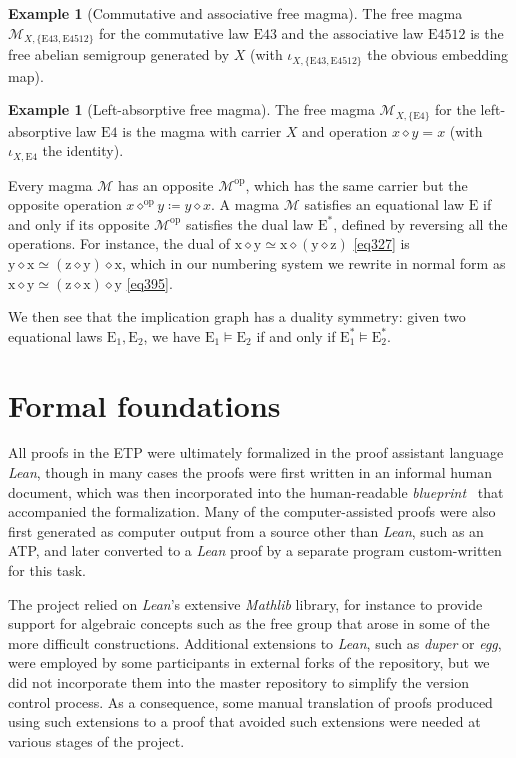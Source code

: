 \documentclass[12pt]{amsart}
\theoremstyle{definition}
\newtheorem{example}[theorem]{Example}
\newcommand{\x}{\mathrm{x}}
\newcommand{\y}{\mathrm{y}}
\newcommand{\z}{\mathrm{z}}
\newcommand{\op}{\diamond}
\newcommand{\formaleq}{\simeq}
\newcommand{\Magma}{{\mathcal{M}}}
\newcommand{\Eq}[1]{\mathrm{E}#1}
\newcommand{\E}{\mathrm{E}}
\begin{document}
\begin{example}[Commutative and associative free magma]\label{semi-group} The free magma $\Magma_{X,\{\Eq{43}, \Eq{4512}\}}$ for the commutative law $\Eq{43}$ and the associative law $\Eq{4512}$ is the free abelian semigroup generated by $X$ (with $\iota_{X,\{\Eq{43},\Eq{4512}\}}$ the obvious embedding map).
\end{example}

\begin{example}[Left-absorptive free magma]\label{left-absorb}
The free magma $\Magma_{X,\{\Eq{4}\}}$ for the left-absorptive law $\Eq{4}$ is the magma with carrier $X$ and operation $x \op y = x$ (with $\iota_{X,\Eq{4}}$ the identity).
\end{example}


Every magma $\Magma$ has an opposite $\Magma^{\mathrm{op}}$, which has the same carrier but the opposite operation $x \op^{\mathrm{op}} y \coloneqq y \op x$.  A magma $\Magma$ satisfies an equational law $\E$ if and only if its opposite $\Magma^{\mathrm{op}}$ satisfies the dual law $\E^*$, defined by reversing all the operations.  For instance, the dual of
$\x \op \y \formaleq \x \op (\y \op \z)$ \eqref{eq327} is $\y \op \x \formaleq (\z \op \y) \op \x$, which in our numbering system we rewrite in normal form as $\x \op \y \formaleq (\z \op \x) \op \y$ \eqref{eq395}.

We then see that the implication graph has a duality symmetry: given two equational laws $\E_1,\E_2$, we have $\E_1 \models \E_2$ if and only if $\E_1^* \models \E_2^*$.

\section{Formal foundations}


All proofs in the ETP were ultimately formalized in the proof assistant language \emph{Lean}, though in many cases the proofs were first written in an informal human document, which was then incorporated into the human-readable \emph{blueprint}~\cite{leanblueprint} that accompanied the formalization.  Many of the computer-assisted proofs were also first generated as computer output from a source other than \emph{Lean}, such as an ATP, and later converted to a \emph{Lean} proof by a separate program custom-written for this task.

The project relied on \emph{Lean}'s extensive \emph{Mathlib} library, for instance to provide support for algebraic concepts such as the free group that arose in some of the more difficult constructions.  Additional extensions to \emph{Lean}, such as \emph{duper} or \emph{egg}, were employed by some participants in external forks of the repository, but we did not incorporate them into the master repository to simplify the version control process.  As a consequence, some manual translation of proofs produced using such extensions to a proof that avoided such extensions were needed at various stages of the project.
\end{document}
